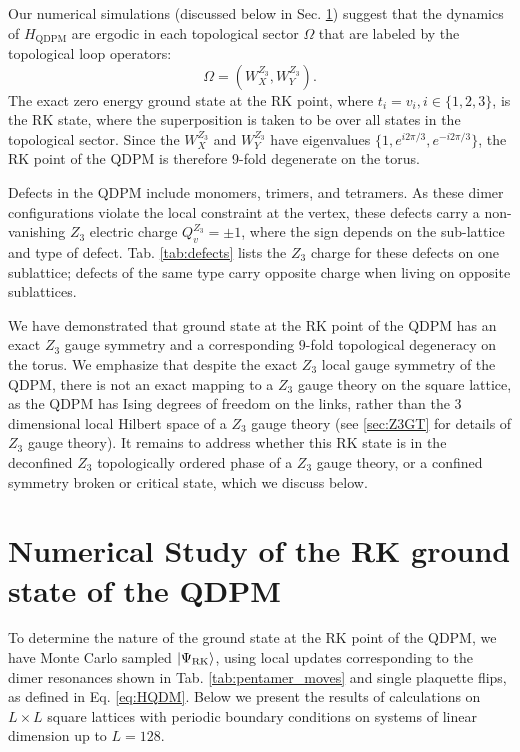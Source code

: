 \documentclass[twocolumn,prb,aps,floatfix,superscriptaddress]{revtex4-1}
\newcommand{\secref}[1]{Sec. \ref{#1}}
\newcommand{\tabref}[1]{Tab. \ref{#1}}
\newcommand{\ket}[1]{| #1 \rangle}
\newcommand{\Eqref}[1]{Eq. \eqref{#1}}
\newcommand{\HQDPM}{H_\mathrm{QDPM}}
\begin{document}
Our numerical simulations (discussed below in \secref{sec:numerics}) suggest that the dynamics of $\HQDPM$ are ergodic in each topological sector $\Omega$ that are labeled by the topological loop operators:
\begin{equation}
\Omega = \left(W_X^{Z_3},W_Y^{Z_3} \right).
\end{equation}
The exact zero energy ground state at the RK point, where $t_i=v_i, i \in \{ 1,2,3\}$, is the RK state, where the superposition is taken to be over all states in the topological sector. Since the $W_{X}^{Z_3}$ and  $W_{Y}^{Z_3}$ have eigenvalues $\{1,e^{i2\pi/3},e^{-i2\pi/3}\}$, the RK point of the QDPM is therefore 9-fold degenerate on the torus.

Defects in the QDPM include monomers, trimers, and tetramers. As these dimer configurations violate the local constraint at the vertex, these defects carry a non-vanishing $Z_3$ electric charge $Q_v^{Z_3} = \pm 1$, where the sign depends on the sub-lattice and type of defect. \tabref{tab:defects} lists the $Z_3$ charge for these defects on one sublattice; defects of the same type carry opposite charge when living on opposite sublattices.

We have demonstrated that ground state at the RK point of the QDPM has an exact $Z_3$ gauge symmetry and a corresponding $9$-fold topological degeneracy on the torus. We emphasize that despite the exact $Z_3$ local gauge symmetry of the QDPM, there is not an exact mapping to a $Z_3$ gauge theory on the square lattice, as the QDPM has Ising degrees of freedom on the links, rather than the 3 dimensional local Hilbert space of a $Z_3$ gauge theory (see \ref{sec:Z3GT} for details of $Z_3$ gauge theory).  It remains to address whether this RK state is in the deconfined $Z_3$ topologically ordered phase of a $Z_3$ gauge theory, or a confined symmetry broken or critical state, which we discuss below.


\section{Numerical Study of the RK ground state of the QDPM}
\label{sec:numerics}

To determine the nature of the ground state at the RK point of the QDPM, we have Monte Carlo sampled $\ket{\Psi_{\rm{RK}}}$, using local updates corresponding to the dimer resonances shown in \tabref{tab:pentamer_moves} and single plaquette flips, as defined in \Eqref{eq:HQDM}. Below we present the results of calculations on $L\times L$ square lattices with periodic boundary conditions on systems of linear dimension up to $L=128$.
\end{document}
